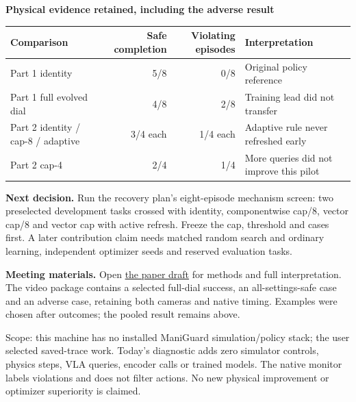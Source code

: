 \documentclass[11pt,a4paper]{article}
\begin{document}
\vspace{2mm}
\textbf{Physical evidence retained, including the adverse result}\par
\begin{center}
\footnotesize
\begin{tabular}{lrrl}
\toprule
Comparison & Safe completion & Violating episodes & Interpretation \\
\midrule
Part 1 identity & 5/8 & 0/8 & Original policy reference \\
Part 1 full evolved dial & 4/8 & 2/8 & Training lead did not transfer \\
Part 2 identity / cap-8 / adaptive & 3/4 each & 1/4 each & Adaptive rule never refreshed early \\
Part 2 cap-4 & 2/4 & 1/4 & More queries did not improve this pilot \\
\bottomrule
\end{tabular}
\end{center}
\vspace{-2mm}
\textbf{Next decision.} Run the recovery plan's eight-episode mechanism screen:
two preselected development tasks crossed with identity, componentwise cap/8,
vector cap/8 and vector cap with active refresh. Freeze the cap, threshold and
cases first. A later contribution claim needs matched random search and ordinary
learning, independent optimizer seeds and reserved evaluation tasks.

\textbf{Meeting materials.} Open \href{draft.pdf}{the paper draft} for
methods and full interpretation. The video package contains a selected full-dial
success, an all-settings-safe case and an adverse case, retaining both cameras and
native timing. Examples were chosen after outcomes; the pooled result remains above.

{\footnotesize\color{muted}
Scope: this machine has no installed ManiGuard simulation/policy stack; the user
selected saved-trace work. Today's diagnostic adds zero simulator controls, physics
steps, VLA queries, encoder calls or trained models. The native monitor labels
violations and does not filter actions. No new physical improvement or optimizer
superiority is claimed.}
\end{document}

